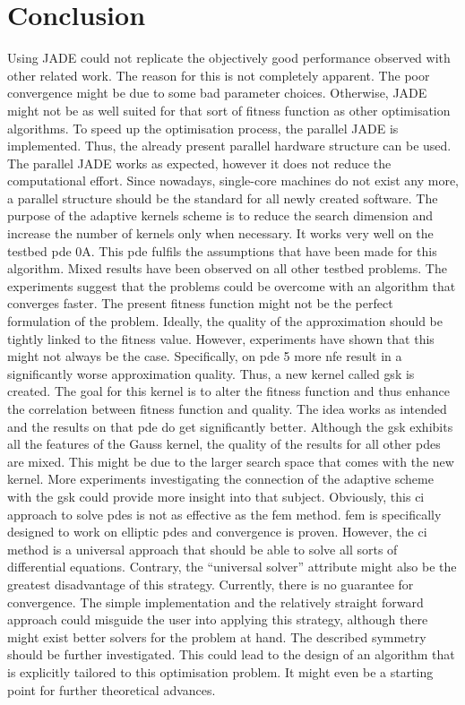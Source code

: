 \documentclass[./\jobname.tex]{subfiles}
\begin{document}
\section{Conclusion}
Using JADE could not replicate the objectively good performance observed with other related work. The reason for this is not completely apparent. The poor convergence might be due to some bad parameter choices. Otherwise, JADE might not be as well suited for that sort of fitness function as other optimisation algorithms. To speed up the optimisation process, the parallel JADE is implemented. Thus, the already present parallel hardware structure can be used. The parallel JADE works as expected, however it does not reduce the computational effort. Since nowadays, single-core machines do not exist any more, a parallel structure should be the standard for all newly created software. The purpose of the adaptive kernels scheme is to reduce the search dimension and increase the number of kernels only when necessary. It works very well on the testbed \gls{pde} 0A. This \gls{pde} fulfils the assumptions that have been made for this algorithm. Mixed results have been observed on all other testbed problems. The experiments suggest that the problems could be overcome with an algorithm that converges faster. The present fitness function might not be the perfect formulation of the problem. Ideally, the quality of the approximation should be tightly linked to the fitness value. However, experiments have shown that this might not always be the case. Specifically, on \gls{pde} 5 more \gls{nfe} result in a significantly worse approximation quality. Thus, a new kernel called \gls{gsk} is created. The goal for this kernel is to alter the fitness function and thus enhance the correlation between fitness function and quality. The idea works as intended and the results on that \gls{pde} do get significantly better. Although the \gls{gsk} exhibits all the features of the Gauss kernel, the quality of the results for all other \gls{pde}s are mixed. This might be due to the larger search space that comes with the new kernel. More experiments investigating the connection of the adaptive scheme with the \gls{gsk} could provide more insight into that subject. Obviously, this \gls{ci} approach to solve \gls{pde}s is not as effective as the \gls{fem} method. \gls{fem} is specifically designed to work on elliptic \gls{pde}s and convergence is proven. However, the \gls{ci} method is a universal approach that should be able to solve all sorts of differential equations. Contrary, the ``universal solver'' attribute might also be the greatest disadvantage of this strategy. Currently, there is no guarantee for convergence. The simple implementation and the relatively straight forward approach could misguide the user into applying this strategy, although there might exist better solvers for the problem at hand. The described symmetry should be further investigated. This could lead to the design of an algorithm that is explicitly tailored to this optimisation problem. It might even be a starting point for further theoretical advances.
\end{document}

